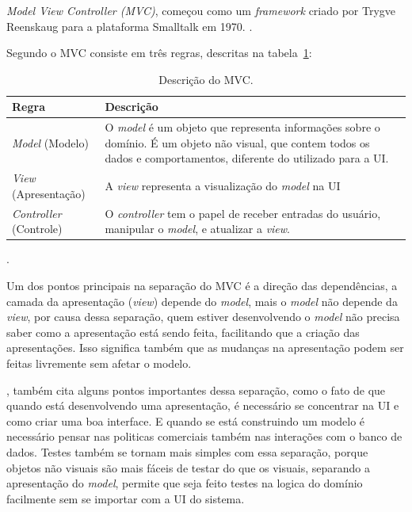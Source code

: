 \textit{Model View Controller (MVC)}, começou como um \textit{framework} criado por Trygve Reenskaug para a plataforma Smalltalk em 1970. \cite[p.~321]{martin_fowler_patterns}.

Segundo  o \ac{MVC} consiste em três regras, descritas na tabela~\ref{tbl:mvc}:

\begin{table}[htp]
    \begin{center}
        \begin{tabular}{|l|p{10cm}|}
            \hline \textbf{Regra} & \textbf{Descrição} \\
            \hline \textit{Model} (Modelo) & 
            O \textit{model} é um objeto que representa informações sobre o domínio. É um objeto não visual, que contem todos os dados e comportamentos, diferente do utilizado para a UI. \\
            \hline \textit{View} (Apresentação) & 
            A \textit{view} representa a visualização do \textit{model} na \ac{UI} \\
            \hline \textit{Controller} (Controle) & 
            O \textit{controller} tem o papel de receber entradas do usuário, manipular o \textit{model}, e atualizar a \textit{view}. \\
            \hline
        \end{tabular}
        \caption{Descrição do \ac{MVC}.}.
        \label{tbl:mvc}
    \end{center}
\end{table}

Um dos pontos principais na separação do \ac{MVC} é a direção das dependências, a camada da apresentação (\textit{view}) depende do \textit{model}, mais o \textit{model} não depende da \textit{view}, por causa dessa separação, quem estiver desenvolvendo o \textit{model} não precisa saber como a apresentação está sendo feita, facilitando que a criação das apresentações. Isso significa também que as mudanças na apresentação podem ser feitas livremente sem afetar o modelo.

, também cita alguns pontos importantes dessa separação, como o fato de que quando está desenvolvendo uma apresentação, é necessário se concentrar na \ac{UI} e como criar uma boa interface. E quando se está construindo um modelo é necessário pensar nas politicas comerciais também nas interações com o banco de dados. Testes também se tornam mais simples com essa separação, porque objetos não visuais são mais fáceis de testar do que os visuais, separando a apresentação do \textit{model}, permite que seja feito testes na logica do domínio facilmente sem se importar com a \ac{UI} do sistema.
